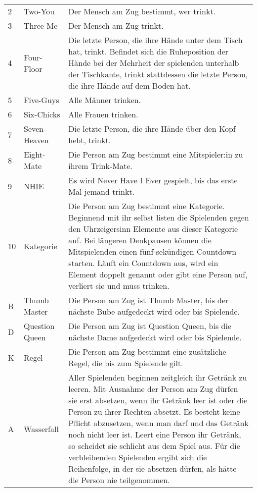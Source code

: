 \begin{tabular}{p{1em} p{4em} p{23em}}
    2   &	Two-You           &	Der Mensch am Zug bestimmt, wer trinkt.\\[1ex]
    3   &	Three-Me          &	Der Mensch am Zug trinkt.\\[1ex]
    4   &	Four-Floor        &	Die letzte Person, die ihre Hände unter dem Tisch hat, trinkt.
    Befindet sich die Ruheposition der Hände bei der Mehrheit der spielenden unterhalb der Tischkante, trinkt stattdessen die letzte Person, die ihre Hände auf dem Boden hat.\\[1ex]
    5   &	Five-Guys         &	Alle Männer trinken.\\[1ex]
    6   &	Six-Chicks        & Alle Frauen trinken.\\[1ex]
    7   &	Seven-Heaven      & Die letzte Person, die ihre Hände über den Kopf hebt, trinkt.\\[1ex]
    8   &	Eight-Mate        & Die Person am Zug bestimmt eine Mitspieler:in zu ihrem Trink-Mate.\\[1ex]
    9   &	NHIE              &	Es wird \glqq Never Have I Ever\grqq{} gespielt, bis das erste Mal jemand trinkt.\\[1ex]
    10  & Kategorie           & Die Person am Zug bestimmt eine Kategorie.
    Beginnend mit ihr selbst listen die Spielenden gegen den Uhrzeigersinn Elemente aus dieser Kategorie auf.
    Bei längeren Denkpausen können die Mitspielenden einen fünf-sekündigen Countdown starten.
    Läuft ein Countdown aus, wird ein Element doppelt genannt oder gibt eine Person auf, verliert sie und muss trinken.\\[1ex]
    B   &	Thumb Master      &	Die Person am Zug ist Thumb Master, bis der nächste Bube aufgedeckt wird oder bis Spielende.\\[1ex]
    D   &	Question Queen    &	Die Person am Zug ist Question Queen, bis die nächste Dame aufgedeckt wird oder bis Spielende.\\[1ex]
    K   &	Regel             &	Die Person am Zug bestimmt eine zusätzliche Regel, die bis zum Spielende gilt.\\[1ex]
    A   &	Wasserfall        &	Aller Spielenden beginnen zeitgleich ihr Getränk zu leeren.
    Mit Ausnahme der Person am Zug dürfen sie erst absetzen, wenn ihr Getränk leer ist oder die Person zu ihrer Rechten absetzt.
    Es besteht keine Pflicht abzusetzen, wenn man darf und das Getränk noch nicht leer ist.
    Leert eine Person ihr Getränk, so scheidet sie schlicht aus dem Spiel aus.
    Für die verbleibenden Spielenden ergibt sich die Reihenfolge, in der sie absetzen dürfen, als hätte die Person nie teilgenommen.\\[1ex]
\end{tabular}

